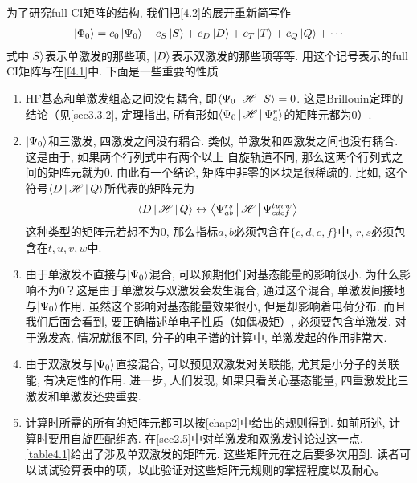 为了研究full CI矩阵的结构, 
我们把\eqref{4.2}的展开重新简写作
\begin{align}
\Ket{\Phi_0} = c_0\Ket{\Psi_0} + c_S\Ket{S}+c_D\Ket{D} + c_T\Ket{T} + c_Q\Ket{Q} + \cdots
\end{align}
式中$\Ket{S}$表示单激发的那些项, 
$\Ket{D}$表示双激发的那些项等等. 
用这个记号表示的full CI矩阵写在\ref{f4.1}中. 
下面是一些重要的性质
\begin{enumerate}[1.]
	\item HF基态和单激发组态之间没有耦合, 即$\Braket{\Psi_0|\mathscr{H}|S}=0$. 这是Brillouin定理的结论（见\ref{sec3.3.2}, 定理指出, 所有形如$\Braket{\Psi_0|\mathscr{H}|\Psi_a^r}$的矩阵元都为0）.
	\item
	$\Ket{\Psi_0}$和三激发, 四激发之间没有耦合. 类似, 单激发和四激发之间也没有耦合. 这是由于, 如果两个行列式中有两个以上 自旋轨道不同, 那么这两个行列式之间的\ha 矩阵元就为0. 由此有一个结论, 矩阵中非零的区块是很稀疏的. 比如, 这个符号$\Braket{D|\mathscr{H}|Q}$所代表的矩阵元为
	\begin{align*}
	\Braket{D|\mathscr{H}|Q} \leftrightarrow \Braket{\Psi_{ab}^{rs}|\mathscr{H}|\Psi_{cdef}^{tuvw}}
	\end{align*}
	这种类型的矩阵元若想不为0, 那么指标$a,b$必须包含在$\{c,d,e,f\}$中, $r,s$必须包含在$t,u,v,w$中.
	
	\item
	由于单激发不直接与$\Ket{\Psi_0}$混合, 可以预期他们对基态能量的影响很小. 为什么影响不为0？这是由于单激发与双激发会发生混合, 通过这个混合, 单激发间接地与$\Ket{\Psi_0}$作用. 虽然这个影响对基态能量效果很小, 但是却影响着电荷分布. 而且我们后面会看到, 要正确描述单电子性质（如偶极矩）, 必须要包含单激发. 对于激发态, 情况就很不同, 分子的电子谱的计算中, 单激发起的作用非常大.
	\item 
	由于双激发与$\Ket{\Psi_0}$直接混合, 可以预见双激发对关联能, 尤其是小分子的关联能, 有决定性的作用. 进一步, 人们发现, 如果只看关心基态能量, 四重激发比三激发和单激发还要重要.
	\item
	计算时所需的所有的矩阵元都可以按\ref{chap2}中给出的规则得到. 如前所述, 计算时要用自旋匹配组态. 在\ref{sec2.5}中对单激发和双激发讨论过这一点. \ref{table4.1}给出了涉及单双激发的矩阵元. 这些矩阵元在之后要多次用到. 读者可以试试验算表中的项，以此验证对这些矩阵元规则的掌握程度以及耐心。
\end{enumerate}
